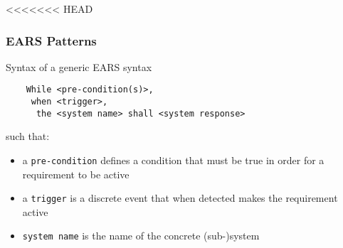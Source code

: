 \documentclass[aspectratio=169]{beamer}
\begin{document}
<<<<<<< HEAD
\begin{frame}[fragile]
  \frametitle{EARS Patterns}
  \begin{block}{Syntax of a generic EARS syntax}
    \begin{verbatim}
    While <pre-condition(s)>, 
     when <trigger>, 
      the <system name> shall <system response>  
    \end{verbatim}
    such that:
    \begin{itemize}
      \item a {\tt pre-condition} defines a condition that must be true in order for a requirement to be active
      \item a {\tt trigger} is a discrete event that when detected makes the requirement active
      \item {\tt system name} is the name of the concrete (sub{-})system 
    \end{itemize}
  \end{block}

\end{frame}
\end{document}
